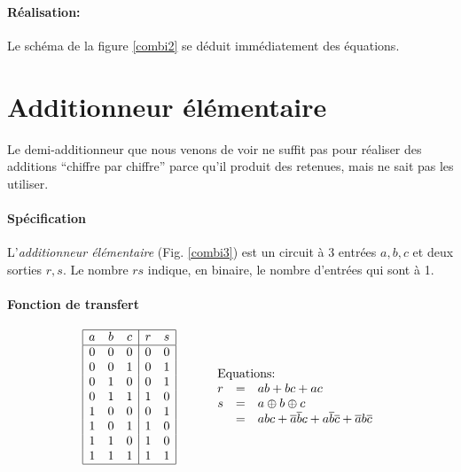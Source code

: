 \paragraph{R\'ealisation:} Le sch\'ema de la figure \ref{combi2} se d\'eduit imm\'ediatement des \'equations.



\section{Additionneur \'el\'ementaire}

Le demi-additionneur que nous venons de voir ne suffit pas pour r\'ealiser des
additions ``chiffre par chiffre'' parce qu'il produit des retenues, mais
 ne sait pas les utiliser. 

\paragraph{Sp\'ecification} 
L'{\em additionneur \'el\'ementaire} (Fig. \ref{combi3})
est un circuit \`a 3 entr\'ees $a,b,c$ et deux sorties $r,s$. Le nombre
$rs$ indique, en binaire, le nombre d'entr\'ees qui sont \`a 1.
\paragraph{Fonction de transfert}
$$
\begin{array}{|ccc|cc|}
\hline
	a& b& c&	r & s\\
\hline
	0 & 0 & 0 &	0 & 0 \\
	0 & 0 & 1 &	0 & 1 \\
	0 & 1 & 0 &	0 & 1 \\
	0 & 1 & 1 &	1 & 0 \\
	1 & 0 & 0 &	0 & 1 \\
	1 & 0 & 1 &	1 & 0 \\
	1 & 1 & 0 &	1 & 0 \\
	1 & 1 & 1 &	1 & 1 \\
\hline
\end{array} \hspace{1cm}
\begin{array}{rcl}
\multicolumn{3}{l}{\mbox{Equations:}} \\
r &=& a b + bc +a c\\
 s &=& a \oplus b \oplus c \\
	&= & abc + \overline{a}\overline{b}c + a\overline{b}\overline{c} 
+ \overline{a}b\overline{c}
\end{array}
$$

